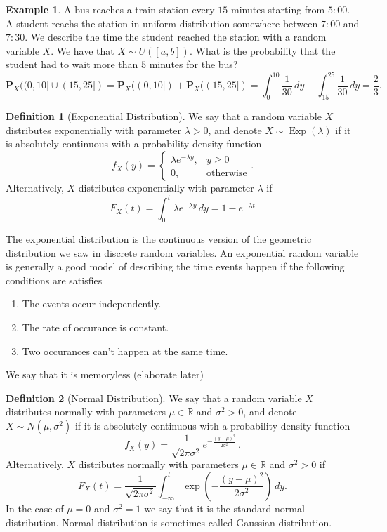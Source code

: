 \documentclass[11pt,a4paper]{article}
\theoremstyle{definition}
\newtheorem{definition}{Definition}[section]
\newtheorem{example}{Example}[section]
\theoremstyle{plain}
\DeclareMathOperator{\Exp}{Exp}
\newcommand{\R}{\mathbb{R}}
\begin{document}
  \begin{example}
    A bus reaches a train station every $15$ minutes starting from $5:00$.
    A student reachs the station in uniform distribution somewhere between
    $7:00$ and $7:30$. We describe the time the student reached the station
    with a random variable $X$. We have that $X \sim U([a,b])$. What
    is the probability that the student had to wait more than $5$ minutes
    for the bus?
    \[
      \mathbf P_X((0,10] \cup (15,25]) =
      \mathbf P_X((0,10]) + \mathbf P_X((15,25]) =
      \int_{0}^{10} \frac{1}{30}\,dy + \int_{15}^{25} \frac{1}{30}\,dy =
      \frac{2}{3}.
    \]
  \end{example}

  \begin{definition}[Exponential Distribution]
    We say that a random variable $X$ distributes exponentially with parameter
    $\lambda > 0$, and denote $X \sim \Exp(\lambda)$
    if it is absolutely continuous with a probability density function
    \[
      f_X(y) =
      \begin{cases}
        \lambda e^{-\lambda y}, &y \geq 0 \\
        0, &\text{otherwise}
      \end{cases}.
    \]
    Alternatively, $X$ distributes exponentially with parameter $\lambda$ if
    \[
      F_X(t) = \int_{0}^{t} \lambda e^{-\lambda y}\,dy = 1 - e^{-\lambda t}
    \]
  \end{definition}

  The exponential distribution is the continuous version of the geometric
  distribution we saw in discrete random variables. An exponential random
  variable is generally a good model of describing the time events happen
  if the following conditions are satisfies
  \begin{enumerate}
    \item The events occur independently.
    \item The rate of occurance is constant.
    \item Two occurances can't happen at the same time.
  \end{enumerate}
  We say that it is memoryless (elaborate later) %

  \begin{definition}[Normal Distribution]
    We say that a random variable $X$ distributes normally with parameters
    $\mu \in \R$ and $\sigma^2 > 0$, and denote $X \sim N(\mu, \sigma^2)$
    if it is absolutely continuous with a probability density function
    \[
      f_X(y) = 
      \frac {1}{\sqrt {2\pi \sigma ^{2}}}
      e^{-{\frac {(y-\mu)^{2}}{2\sigma ^{2}}}}\,.
    \]
    Alternatively, $X$ distributes normally with parameters $\mu \in \R$ and 
    $\sigma^2 > 0$ if
    \[
      F_X(t) = 
      \frac{1}{\sqrt{2\pi\sigma^{2}}}
      \int_{-\infty}^{t}
      \exp\left(-\frac{(y-\mu)^{2}}{2\sigma^{2}}\right)\,dy.
    \]
    In the case of $\mu = 0$ and $\sigma^2 = 1$ we say that it is the 
    standard normal distribution.
    Normal distribution is sometimes called Gaussian distribution.
  \end{definition}
\end{document}

